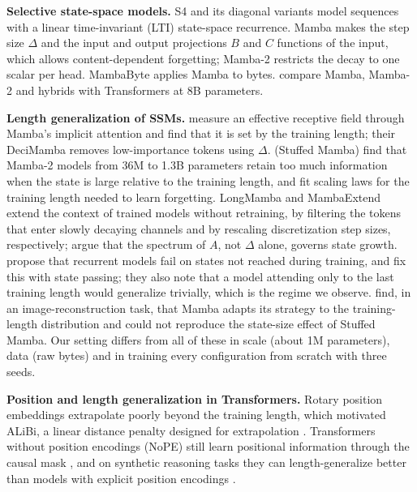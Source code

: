 \documentclass[11pt]{article}
\begin{document}
\textbf{Selective state-space models.} S4 \citep{gu2022s4} and its diagonal variants \citep{gu2022s4d} model sequences with a linear time-invariant (LTI) state-space recurrence. Mamba \citep{gu2023mamba} makes the step size $\Delta$ and the input and output projections $B$ and $C$ functions of the input, which allows content-dependent forgetting; Mamba-2 \citep{dao2024ssd} restricts the decay to one scalar per head. MambaByte \citep{wang2024mambabyte} applies Mamba to bytes. \citet{waleffe2024empirical} compare Mamba, Mamba-2 and hybrids with Transformers at 8B parameters.

\textbf{Length generalization of SSMs.} \citet{benkish2025decimamba} measure an effective receptive field through Mamba's implicit attention and find that it is set by the training length; their DeciMamba removes low-importance tokens using $\Delta$. \citet{chen2025stuffed} (Stuffed Mamba) find that Mamba-2 models from 36M to 1.3B parameters retain too much information when the state is large relative to the training length, and fit scaling laws for the training length needed to learn forgetting. LongMamba \citep{ye2025longmamba} and MambaExtend \citep{azizi2025mambaextend} extend the context of trained models without retraining, by filtering the tokens that enter slowly decaying channels and by rescaling discretization step sizes, respectively; \citet{lu2025modulation} argue that the spectrum of $A$, not $\Delta$ alone, governs state growth. \citet{buitrago2025unexplored} propose that recurrent models fail on states not reached during training, and fix this with state passing; they also note that a model attending only to the last training length would generalize trivially, which is the regime we observe. \citet{rathjens2026probing} find, in an image-reconstruction task, that Mamba adapts its strategy to the training-length distribution and could not reproduce the state-size effect of Stuffed Mamba. Our setting differs from all of these in scale (about 1M parameters), data (raw bytes) and in training every configuration from scratch with three seeds.

\textbf{Position and length generalization in Transformers.} Rotary position embeddings \citep{su2021roformer} extrapolate poorly beyond the training length, which motivated ALiBi, a linear distance penalty designed for extrapolation \citep{press2022alibi}. Transformers without position encodings (NoPE) still learn positional information through the causal mask \citep{haviv2022nope}, and on synthetic reasoning tasks they can length-generalize better than models with explicit position encodings \citep{kazemnejad2023impact}.
\end{document}
